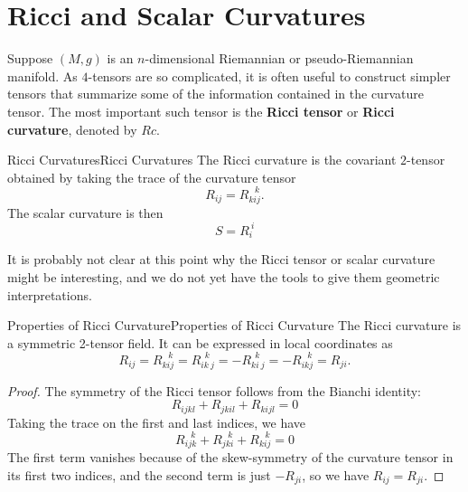 \documentclass[../main.tex]{subfiles}
\begin{document}
\section{Ricci and Scalar Curvatures}
Suppose $(M, g)$ is an $n$-dimensional Riemannian or pseudo-Riemannian manifold. As $4$-tensors are so complicated, it is often useful to construct simpler tensors that summarize some of the information contained in the curvature tensor. The most important such tensor is the \textbf{Ricci tensor} or \textbf{Ricci curvature}, denoted by $Rc$.

\begin{definition}{Ricci Curvatures}{Ricci Curvatures}
	The Ricci curvature is the covariant $2$-tensor obtained by taking the trace of the curvature tensor
	\begin{equation}
		R_{ij} = R_{kij}^{\ \ \ k}.
	\end{equation}
	The scalar curvature is then
	\begin{equation}
		S = R_{i}^{\ i}
	\end{equation}
\end{definition}

\begin{remark}
	It is probably not clear at this point why the Ricci tensor or scalar curvature might be interesting, and we do not yet have the tools to give them geometric interpretations.
\end{remark}

\begin{lemma}{Properties of Ricci Curvature}{Properties of Ricci Curvature}
	The Ricci curvature is a symmetric 2-tensor field. It can be expressed in local coordinates as
	\begin{equation}
		R_{ij} = R_{kij}^{\ \ \ k} = R_{ik\ j}^{\ \ k} = -R_{ki\ j}^{\ \ k} = -R_{ikj}^{\ \ \ k} = R_{ji}.
	\end{equation}
\end{lemma}
\begin{proof}
	The symmetry of the Ricci tensor follows from the Bianchi identity:
	\begin{equation*}
		R_{ijkl} + R_{jkil} + R_{kijl} = 0
	\end{equation*}
	Taking the trace on the first and last indices, we have
	\begin{equation*}
		R_{ijk}^{\ \ \ k} + R_{jki}^{\ \ \ k} + R_{kij}^{\ \ \ k} = 0
	\end{equation*}
	The first term vanishes because of the skew-symmetry of the curvature tensor in its first two indices, and the second term is just $-R_{ji}$, so we have $R_{ij} = R_{ji}$.
\end{proof}
\end{document}
